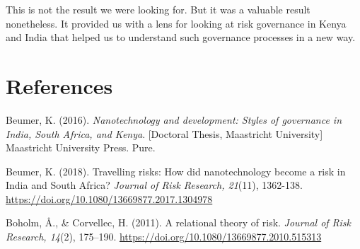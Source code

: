 \documentclass[authordate, empirical]{jote-new-article}
\begin{document}
	This is not the result we were looking for. But it was a valuable result nonetheless. It provided us with a lens for looking at risk governance in Kenya and India that helped us to understand such governance processes in a new way.






	\section{References}



	Beumer, K. (2016). \emph{Nanotechnology and development: Styles of governance in India, South Africa, and Kenya}. [Doctoral Thesis, Maastricht University] Maastricht University Press. Pure.



	Beumer, K. (2018). Travelling risks: How did nanotechnology become a risk in India and South Africa? \emph{Journal of Risk Research, 21}(11), 1362-138. \url{https://doi.org/10.1080/13669877.2017.1304978}



	Boholm, Å., \& Corvellec, H. (2011). A relational theory of risk. \emph{Journal of Risk Research, 14}(2), 175--190. \url{https://doi.org/10.1080/13669877.2010.515313}
\end{document}
